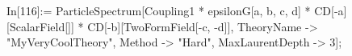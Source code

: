 In[116]:= ParticleSpectrum[Coupling1 * epsilonG[a, b, c, d] * CD[-a][ScalarField[]] * CD[-b][TwoFormField[-c, -d]], TheoryName -> "MyVeryCoolTheory", Method -> "Hard", MaxLaurentDepth -> 3]; 